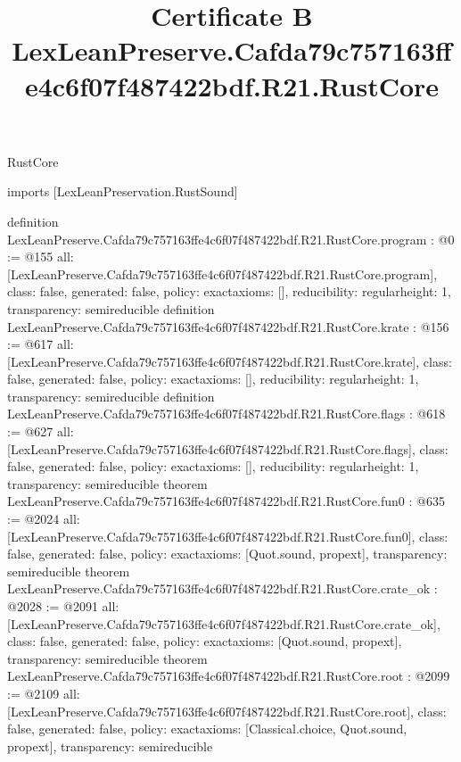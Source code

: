 \begin{lexlean}{RustCore}
\title{Certificate B LexLeanPreserve.Cafda79c757163ffe4c6f07f487422bdf.R21.RustCore}
\begin{coremodule}
imports [LexLeanPreservation.RustSound]

definition LexLeanPreserve.Cafda79c757163ffe4c6f07f487422bdf.R21.RustCore.program : @0 := @155 {
  all: [LexLeanPreserve.Cafda79c757163ffe4c6f07f487422bdf.R21.RustCore.program],
  class: false,
  generated: false,
  policy: exact{axioms: []},
  reducibility: regular{height: 1},
  transparency: semireducible
}
definition LexLeanPreserve.Cafda79c757163ffe4c6f07f487422bdf.R21.RustCore.krate : @156 := @617 {
  all: [LexLeanPreserve.Cafda79c757163ffe4c6f07f487422bdf.R21.RustCore.krate],
  class: false,
  generated: false,
  policy: exact{axioms: []},
  reducibility: regular{height: 1},
  transparency: semireducible
}
definition LexLeanPreserve.Cafda79c757163ffe4c6f07f487422bdf.R21.RustCore.flags : @618 := @627 {
  all: [LexLeanPreserve.Cafda79c757163ffe4c6f07f487422bdf.R21.RustCore.flags],
  class: false,
  generated: false,
  policy: exact{axioms: []},
  reducibility: regular{height: 1},
  transparency: semireducible
}
theorem LexLeanPreserve.Cafda79c757163ffe4c6f07f487422bdf.R21.RustCore.fun0 : @635 := @2024 {
  all: [LexLeanPreserve.Cafda79c757163ffe4c6f07f487422bdf.R21.RustCore.fun0],
  class: false,
  generated: false,
  policy: exact{axioms: [Quot.sound, propext]},
  transparency: semireducible
}
theorem LexLeanPreserve.Cafda79c757163ffe4c6f07f487422bdf.R21.RustCore.crate_ok : @2028 := @2091 {
  all: [LexLeanPreserve.Cafda79c757163ffe4c6f07f487422bdf.R21.RustCore.crate_ok],
  class: false,
  generated: false,
  policy: exact{axioms: [Quot.sound, propext]},
  transparency: semireducible
}
theorem LexLeanPreserve.Cafda79c757163ffe4c6f07f487422bdf.R21.RustCore.root : @2099 := @2109 {
  all: [LexLeanPreserve.Cafda79c757163ffe4c6f07f487422bdf.R21.RustCore.root],
  class: false,
  generated: false,
  policy: exact{axioms: [Classical.choice, Quot.sound, propext]},
  transparency: semireducible
}


\end{coremodule}
\end{lexlean}
